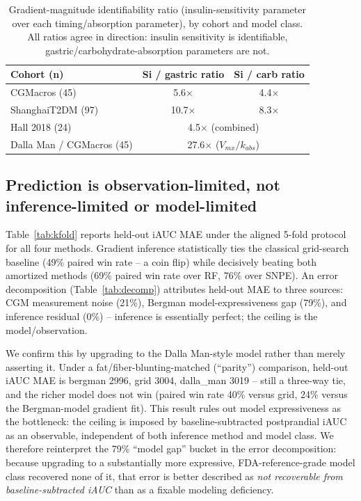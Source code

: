 \documentclass[letterpaper]{article} %
\begin{document}
\begin{table}[t]
\centering\small
\begin{tabular}{@{}lcc@{}}
\toprule
Cohort (n) & Si / gastric ratio & Si / carb ratio \\
\midrule
CGMacros (45) & 5.6$\times$ & 4.4$\times$ \\
ShanghaiT2DM (97) & 10.7$\times$ & 8.3$\times$ \\
Hall 2018 (24) & \multicolumn{2}{c}{4.5$\times$ (combined)} \\
Dalla Man / CGMacros (45) & \multicolumn{2}{c}{27.6$\times$ ($V_{mx}/k_{abs}$)} \\
\bottomrule
\end{tabular}
\caption{Gradient-magnitude identifiability ratio (insulin-sensitivity parameter over each
timing/absorption parameter), by cohort and model class. All ratios agree in direction: insulin
sensitivity is identifiable, gastric/carbohydrate-absorption parameters are not.}
\label{tab:identifiability}
\end{table}

\subsection{Prediction is observation-limited, not inference-limited or model-limited}
\label{sec:prediction}
Table~\ref{tab:kfold} reports held-out iAUC MAE under the aligned 5-fold protocol for all four
methods. Gradient inference statistically ties the classical grid-search baseline (49\% paired
win rate -- a coin flip) while decisively beating both amortized methods (69\% paired win rate
over RF, 76\% over SNPE). An error decomposition (Table~\ref{tab:decomp}) attributes held-out MAE
to three sources: CGM measurement noise (21\%), Bergman model-expressiveness gap (79\%), and
inference residual (0\%) -- inference is essentially perfect; the ceiling is the model/observation.

We confirm this by upgrading to the Dalla Man-style model rather than merely asserting it. Under
a fat/fiber-blunting-matched (``parity'') comparison, held-out iAUC MAE is bergman 2996, grid
3004, dalla\_man 3019 -- still a three-way tie, and the richer model does not win (paired win rate
40\% versus grid, 24\% versus the Bergman-model gradient fit). This result rules out model
expressiveness as the bottleneck: the ceiling is imposed by baseline-subtracted postprandial iAUC
as an observable, independent of both inference method and model class. We therefore reinterpret
the 79\% ``model gap'' bucket in the error decomposition: because upgrading to a substantially more
expressive, FDA-reference-grade model class recovered none of it, that error is better described
as \emph{not recoverable from baseline-subtracted iAUC} than as a fixable modeling deficiency.
\end{document}
